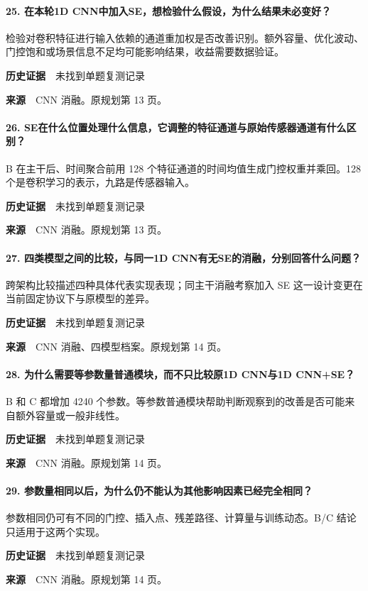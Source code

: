 \paragraph{25. 在本轮1D CNN中加入SE，想检验什么假设，为什么结果未必变好？}
检验对卷积特征进行输入依赖的通道重加权是否改善识别。额外容量、优化波动、门控饱和或场景信息不足均可能影响结果，收益需要数据验证。\par
\textbf{历史证据}　未找到单题复测记录\par
\textbf{来源}　CNN 消融。原规划第 13 页。\par
\paragraph{26. SE在什么位置处理什么信息，它调整的特征通道与原始传感器通道有什么区别？}
B 在主干后、时间聚合前用 128 个特征通道的时间均值生成门控权重并乘回。128 个是卷积学习的表示，九路是传感器输入。\par
\textbf{历史证据}　未找到单题复测记录\par
\textbf{来源}　CNN 消融。原规划第 13 页。\par
\paragraph{27. 四类模型之间的比较，与同一1D CNN有无SE的消融，分别回答什么问题？}
跨架构比较描述四种具体代表实现表现；同主干消融考察加入 SE 这一设计变更在当前固定协议下与原模型的差异。\par
\textbf{历史证据}　未找到单题复测记录\par
\textbf{来源}　CNN 消融、四模型档案。原规划第 14 页。\par
\paragraph{28. 为什么需要等参数量普通模块，而不只比较原1D CNN与1D CNN+SE？}
B 和 C 都增加 4240 个参数。等参数普通模块帮助判断观察到的改善是否可能来自额外容量或一般非线性。\par
\textbf{历史证据}　未找到单题复测记录\par
\textbf{来源}　CNN 消融。原规划第 14 页。\par
\paragraph{29. 参数量相同以后，为什么仍不能认为其他影响因素已经完全相同？}
参数相同仍可有不同的门控、插入点、残差路径、计算量与训练动态。B/C 结论只适用于这两个实现。\par
\textbf{历史证据}　未找到单题复测记录\par
\textbf{来源}　CNN 消融。原规划第 14 页。\par
